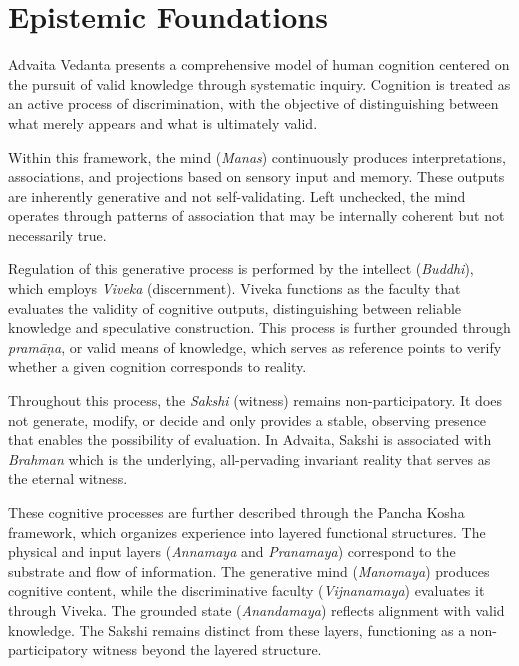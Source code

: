 \documentclass[12pt,a4paper]{article}
\begin{document}
\section{Epistemic Foundations}
Advaita Vedanta presents a comprehensive model of human cognition centered on the pursuit of valid knowledge through systematic inquiry. Cognition is treated as an active process of discrimination, with the objective of distinguishing between what merely appears and what is ultimately valid.

Within this framework, the mind (\textit{Manas}) continuously produces interpretations, associations, and projections based on sensory input and memory. These outputs are inherently generative and not self-validating. Left unchecked, the mind operates through patterns of association that may be internally coherent but not necessarily true.

Regulation of this generative process is performed by the intellect (\textit{Buddhi}), which employs \textit{Viveka} (discernment). Viveka functions as the faculty that evaluates the validity of cognitive outputs, distinguishing between reliable knowledge and speculative construction. This process is further grounded through \textit{pramāṇa}, or valid means of knowledge, which serves as reference points to verify whether a given cognition corresponds to reality.

Throughout this process, the \textit{Sakshi} (witness) remains non-participatory. It does not generate, modify, or decide and only provides a stable, observing presence that enables the possibility of evaluation. In Advaita, Sakshi is associated with \textit{Brahman} which is the underlying, all-pervading invariant reality that serves as the eternal witness.

These cognitive processes are further described through the Pancha Kosha framework, which organizes experience into layered functional structures. The physical and input layers (\textit{Annamaya} and \textit{Pranamaya}) correspond to the substrate and flow of information. The generative mind (\textit{Manomaya}) produces cognitive content, while the discriminative faculty (\textit{Vijnanamaya}) evaluates it through Viveka. The grounded state (\textit{Anandamaya}) reflects alignment with valid knowledge. The Sakshi remains distinct from these layers, functioning as a non-participatory witness beyond the layered structure.
\end{document}
